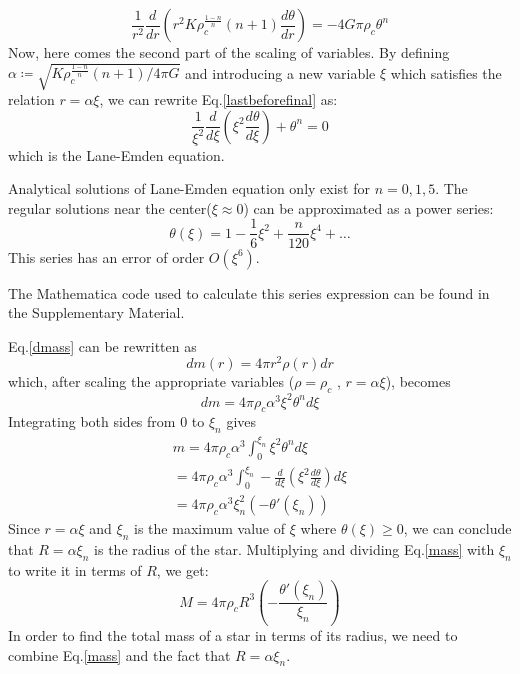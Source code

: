 \documentclass[aps,twocolumn,showpacs,preprintnumbers,nofootinbib,prl,superscriptaddress,groupedaddress]{revtex4-2}
\begin{document}
\begin{enumerate}[label=(\alph*)]
\begin{equation}
        \frac{1}{r^{2}}\frac{d}{dr}\left(r^{2}K\rho_{c}^{\frac{1-n}{n}}(n+1)\frac{d\theta}{dr}\right) = -4G\pi \rho_{c}\theta^{n} \label{lastbeforefinal}
    \end{equation}
    Now, here comes the second part of the scaling of variables. By defining $\alpha \coloneqq \sqrt{K\rho_{c}^{\frac{1-n}{n}}(n+1)/4\pi G}$ and introducing a new variable $\xi$ which satisfies the relation $r = \alpha\xi$, we can rewrite Eq.\eqref{lastbeforefinal} as:
    \begin{equation}
        \frac{1}{\xi^{2}}\frac{d}{d\xi} \left(\xi^{2}\frac{d\theta}{d\xi}\right) + \theta^{n} = 0 \label{laneemden}
    \end{equation}
    which is the Lane-Emden equation.
    
    Analytical solutions of Lane-Emden equation only exist for $n=0,1,5$. The regular solutions near the center($\xi\approx 0$) can be approximated as a power series:
    \begin{equation}
        \theta(\xi) = 1 - \frac{1}{6}\xi^{2} + \frac{n}{120}\xi^{4} + \dots
    \end{equation}
    This series has an error of order $O(\xi^{6})$.
    
    The Mathematica code used to calculate this series expression can be found in the Supplementary Material.
    
    Eq.\eqref{dmass} can be rewritten as
    \begin{equation}
        dm(r) = 4\pi r^{2}\rho(r)dr \label{dmassnew}
    \end{equation}
    which, after scaling the appropriate variables ($\rho = \rho_{c}$ , $r = \alpha\xi$), becomes
    \begin{equation}
        dm = 4\pi \rho_{c} \alpha^{3}\xi^{2} \theta^{n}d\xi 
    \end{equation}
    Integrating both sides from $0$ to $\xi_{n}$ gives
    \begin{align}
        m = 4\pi \rho_{c} \alpha^{3} \int_{0}^{\xi_{n}} \xi^{2} \theta^{n}d\xi \nonumber \\
          = 4\pi \rho_{c} \alpha^{3} \int_{0}^{\xi_{n}} -\frac{d}{d\xi} \left(\xi^{2}\frac{d\theta}{d\xi}\right) d\xi \nonumber \\
        = 4\pi \rho_{c} \alpha^{3}\xi_{n}^{2} \left(-\theta '(\xi_{n}) \right) \label{mass}
    \end{align}
    Since $r = \alpha\xi$ and $\xi_{n}$ is the maximum value of $\xi$ where $\theta(\xi) \geq 0$, we can conclude that $R = \alpha\xi_{n}$ is the radius of the star. Multiplying and dividing Eq.\eqref{mass} with $\xi_{n}$ to write it in terms of $R$, we get:
    \begin{equation}
        M = 4\pi \rho_{c} R^{3} \left(-\frac{\theta '(\xi_{n})}{\xi_{n}} \right)
    \end{equation}
    In order to find the total mass of a star in terms of its radius, we need to combine Eq.\eqref{mass} and the fact that $R = \alpha\xi_{n}$.
    

\end{enumerate}
\end{document}
